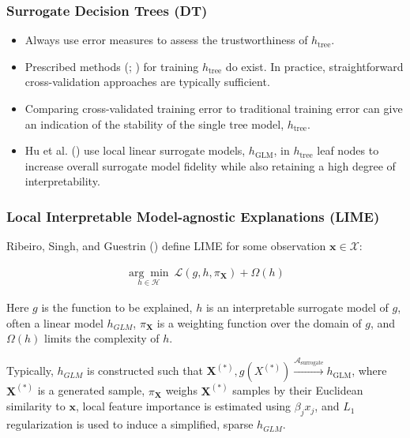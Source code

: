 \documentclass[11pt,aspectratio=169,hyperref={colorlinks}]{beamer}
\begin{document}
	\begin{frame}
		
		\frametitle{Surrogate Decision Trees (DT)}
		
		\begin{itemize}
			
			\item Always use error measures to assess the trustworthiness of $h_{\text{tree}}$.
			
			\item Prescribed methods (\cite{dt_surrogate1}; \cite{dt_surrogate2}) for training $h_{\text{tree}}$ do exist. In practice, straightforward cross-validation approaches are typically sufficient. 
			
			\item Comparing cross-validated training error to traditional training error can give an indication of the stability of the single tree model, $h_{\text{tree}}$.
			
			\item Hu et al. (\citeyear{lime-sup}) use local linear surrogate models, $h_{\text{GLM}}$, in $h_{\text{tree}}$ leaf nodes to increase overall surrogate model fidelity while also retaining a high degree of interpretability.
			
		\end{itemize}
	
	\end{frame}

	\begin{frame}

		\frametitle{Local Interpretable Model-agnostic Explanations (LIME)}
		
		Ribeiro, Singh, and Guestrin (\citeyear{lime}) define LIME for some observation $\mathbf{x} \in \mathcal{X}$:
		
		\begin{equation*}
		\begin{aligned}
		\underset{h \in \mathcal{H}}{\arg\min}\:\mathcal{L}(g, h, \pi_{\mathbf{X}}) + \Omega(h)
		\end{aligned}
		\end{equation*}
		
		Here $g$ is the function to be explained, $h$ is an interpretable surrogate model of $g$, often a linear model $h_{GLM}$, $\pi_{\mathbf{X}}$ is a weighting function over the domain of $g$, and $\Omega(h)$ limits the complexity of $h$.
		
		\vspace{5pt}
		
		Typically, $h_{GLM}$ is constructed such that $\mathbf{X}^{(*)}, g({X}^{(*)}) \xrightarrow{\mathcal{A}_{\text{surrogate}}} h_{\text{GLM}}$, where $\mathbf{X}^{(*)}$ is a generated sample, $\pi_{\mathbf{X}}$ weighs $\mathbf{X}^{(*)}$ samples by their Euclidean similarity to $\mathbf{x}$, local feature importance is estimated using $\beta_j x_j$, and $L_1$ regularization is used to induce a simplified, sparse $h_{GLM}$. 		


	\end{frame}
\end{document}
